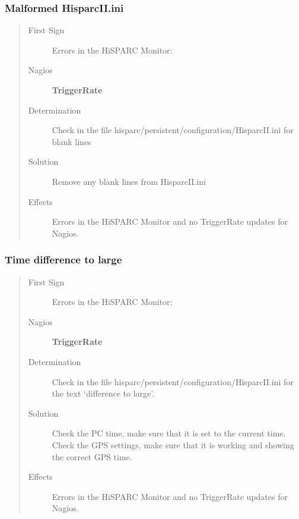 \documentclass[a4paper,11pt,english]{sphinxmanual}
\begin{document}
\subsubsection{Malformed HisparcII.ini}
\label{known-issues:malformed-hisparcii-ini}\begin{quote}\begin{description}
\item[{First Sign}] \leavevmode
Errors in the HiSPARC Monitor: 

\item[{Nagios}] \leavevmode
\textbf{TriggerRate}

\item[{Determination}] \leavevmode
Check in the file hisparc/persistent/configuration/HisparcII.ini for blank lines

\item[{Solution}] \leavevmode
Remove any blank lines from HisparcII.ini

\item[{Effects}] \leavevmode
Errors in the HiSPARC Monitor and no TriggerRate updates for Nagios.

\end{description}\end{quote}


\subsubsection{Time difference to large}
\label{known-issues:time-difference-to-large}\begin{quote}\begin{description}
\item[{First Sign}] \leavevmode
Errors in the HiSPARC Monitor: 

\item[{Nagios}] \leavevmode
\textbf{TriggerRate}

\item[{Determination}] \leavevmode
Check in the file hisparc/persistent/configuration/HisparcII.ini for the text `difference to large'.

\item[{Solution}] \leavevmode
Check the PC time, make sure that it is set to the current time. Check the GPS settings, make sure that it is working and showing the correct GPS time.

\item[{Effects}] \leavevmode
Errors in the HiSPARC Monitor and no TriggerRate updates for Nagios.

\end{description}\end{quote}
\end{document}
